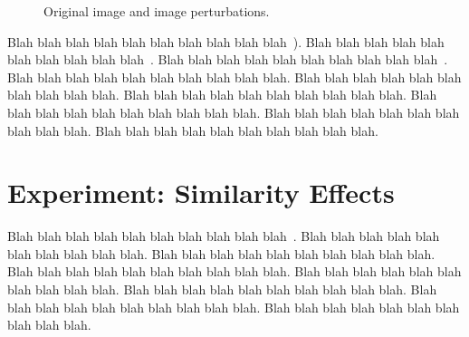 \documentclass[10pt,twocolumn,letterpaper]{article}
\begin{document}
\begin{figure}[h]
    \centering
    \caption{Original image and image perturbations.}
    \label{fig:image_examples}
\end{figure}

Blah blah blah blah blah blah blah blah blah blah~\cite{chen_chinesefoodnet_2017}). Blah blah blah blah blah blah blah blah blah blah~\cite{salvador2017learning, 2019fb}. Blah blah blah blah blah blah blah blah blah blah~\cite{salvador2017learning, mit_github}. Blah blah blah blah blah blah blah blah blah blah. Blah blah blah blah blah blah blah blah blah blah. Blah blah blah blah blah blah blah blah blah blah. Blah blah blah blah blah blah blah blah blah blah. Blah blah blah blah blah blah blah blah blah blah. Blah blah blah blah blah blah blah blah blah blah.

\section{Experiment: Similarity Effects}
Blah blah blah blah blah blah blah blah blah blah~\cite{arandjelovic_three_2012}. Blah blah blah blah blah blah blah blah blah blah. Blah blah blah blah blah blah blah blah blah blah. Blah blah blah blah blah blah blah blah blah blah. Blah blah blah blah blah blah blah blah blah blah. Blah blah blah blah blah blah blah blah blah blah. Blah blah blah blah blah blah blah blah blah blah. Blah blah blah blah blah blah blah blah blah blah.

{\small


}
\end{document}
